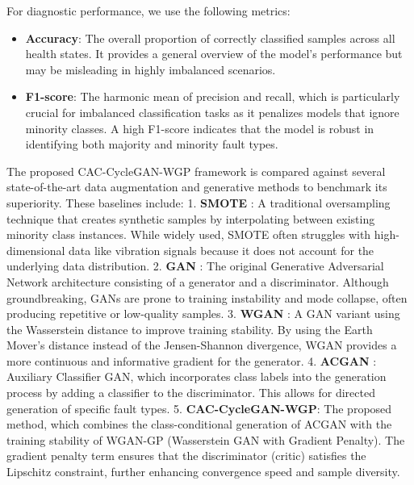 For diagnostic performance, we use the following metrics:
\begin{itemize}
    \item \textbf{Accuracy}: The overall proportion of correctly classified samples across all health states. It provides a general overview of the model's performance but may be misleading in highly imbalanced scenarios.
    \item \textbf{F1-score}: The harmonic mean of precision and recall, which is particularly crucial for imbalanced classification tasks as it penalizes models that ignore minority classes. A high F1-score indicates that the model is robust in identifying both majority and minority fault types.
\end{itemize}

The proposed CAC-CycleGAN-WGP framework is compared against several state-of-the-art data augmentation and generative methods to benchmark its superiority. These baselines include:
1. \textbf{SMOTE} \cite{6}: A traditional oversampling technique that creates synthetic samples by interpolating between existing minority class instances. While widely used, SMOTE often struggles with high-dimensional data like vibration signals because it does not account for the underlying data distribution.
2. \textbf{GAN} \cite{1}: The original Generative Adversarial Network architecture consisting of a generator and a discriminator. Although groundbreaking, GANs are prone to training instability and mode collapse, often producing repetitive or low-quality samples.
3. \textbf{WGAN} \cite{2}: A GAN variant using the Wasserstein distance to improve training stability. By using the Earth Mover's distance instead of the Jensen-Shannon divergence, WGAN provides a more continuous and informative gradient for the generator.
4. \textbf{ACGAN} \cite{5}: Auxiliary Classifier GAN, which incorporates class labels into the generation process by adding a classifier to the discriminator. This allows for directed generation of specific fault types.
5. \textbf{CAC-CycleGAN-WGP}: The proposed method, which combines the class-conditional generation of ACGAN with the training stability of WGAN-GP (Wasserstein GAN with Gradient Penalty). The gradient penalty term ensures that the discriminator (critic) satisfies the Lipschitz constraint, further enhancing convergence speed and sample diversity.

